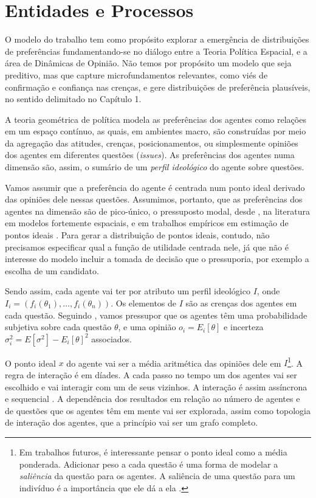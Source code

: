 
\section{Entidades e Processos}


O modelo do trabalho tem como propósito explorar a emergência de distribuições de
preferências fundamentando-se no diálogo entre a Teoria Política Espacial, e a
área de Dinâmicas de Opinião. Não temos por propósito um modelo que seja
preditivo, mas que capture microfundamentos relevantes, como viés de confirmação
e confiança nas crenças, e gere distribuições de
preferência plausíveis, no sentido delimitado no Capítulo 1.

A teoria geométrica de política modela as preferências dos agentes como relações
em um espaço contínuo, as quais, em ambientes macro, são construídas por meio da
agregação das atitudes, crenças, posicionamentos, ou simplesmente opiniões dos
agentes em diferentes questões (\textit{issues}). As preferências dos agentes
numa dimensão são, assim, o sumário de um \textit{perfil ideológico} do agente
sobre questões.

Vamos assumir que a preferência do agente é centrada num ponto ideal derivado
das opiniões dele nessas questões. Assumimos, portanto, que as preferências dos
agentes na dimensão são de pico-único, o pressuposto modal, desde
, na literatura em modelos fortemente espaciais, e
em trabalhos empíricos em estimação de pontos ideais \cite{carroll2013structure,
  armstrong2014analyzing, schofield1998nash}. Para gerar a distribuição de
pontos ideais, contudo, não precisamos especificar qual a função de utilidade
centrada nele, já que não é interesse do modelo incluir a tomada de decisão que
o pressuporia, por exemplo a escolha de um candidato.

Sendo assim, cada agente vai ter por atributo um perfil ideológico \(I\), onde
\(I_i = (f_i(\theta_1), \ldots, f_i(\theta_n)) \). Os elementos de \(I\) são as crenças dos
agentes em cada questão. Seguindo , vamos pressupor
que os agentes têm uma probabilidade subjetiva sobre cada questão \(\theta\), e uma
opinião \( o_i = E_i[\theta]\) e incerteza \( \sigma_i^2 = E[\sigma^2] - E_ i[\theta]^2\)
associados.

O ponto ideal \(x\) do agente vai ser a média aritmética das opiniões dele em
\(I\)\footnote{Em trabalhos futuros, é interessante pensar o ponto ideal como a
  média ponderada. Adicionar peso a cada questão é uma forma de modelar a
  \textit{saliência} da questão para os agentes. A saliência de uma questão para
  um indivíduo é a importância que ele dá a ela \cite{munger2015choosing}.}. A
regra de interação é em díades. A cada passo no tempo um dos agentes vai ser
escolhido e vai interagir com um de seus vizinhos. A interação é assim
assíncrona e sequencial
\cite{wilensky2015introduction}. A
dependência dos resultados em relação ao número de agentes e de questões que os
agentes têm em mente vai ser explorada, assim como topologia de interação dos
agentes, que a princípio vai ser um grafo completo.

